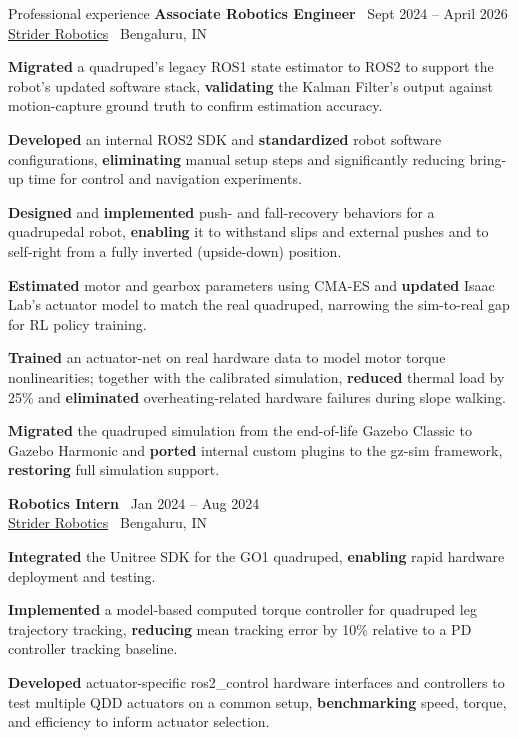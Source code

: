 \documentclass{resume}
\begin{document}
\begin{rSection}{Professional experience}
{\bf Associate Robotics Engineer} \hfill {\ Sept 2024 -- April 2026 }\\ 
{\href{https://www.strider-robotics.in/}{Strider Robotics}} \hfill {\ {Bengaluru, IN}}
\begin{cvitems}
  \item \textbf{Migrated} a quadruped's legacy ROS1 state estimator to ROS2 to support the robot's updated software stack, \textbf{validating} the Kalman Filter's output against motion-capture ground truth to confirm estimation accuracy.  
  \item \textbf{Developed} an internal ROS2 SDK and \textbf{standardized} robot software configurations, \textbf{eliminating} manual setup steps and significantly reducing bring-up time for control and navigation experiments.
  \item \textbf{Designed} and \textbf{implemented} push- and fall-recovery behaviors for a quadrupedal robot, \textbf{enabling} it to withstand slips and external pushes and to self-right from a fully inverted (upside-down) position.
  \item \textbf{Estimated} motor and gearbox parameters using CMA-ES and \textbf{updated} Isaac Lab's actuator model to match the real quadruped, narrowing the sim-to-real gap for RL policy training.
  \item \textbf{Trained} an actuator-net on real hardware data to model motor torque nonlinearities; together with the calibrated simulation, \textbf{reduced} thermal load by 25\% and \textbf{eliminated} overheating-related hardware failures during slope walking.
  \item \textbf{Migrated} the quadruped simulation from the end-of-life Gazebo Classic to Gazebo Harmonic and \textbf{ported} internal custom plugins to the gz-sim framework, \textbf{restoring} full simulation support.
\end{cvitems}
{\bf  Robotics Intern} \hfill {\ Jan 2024 -- Aug 2024 }\\ 
{\href{https://www.strider-robotics.in/}{Strider Robotics}} \hfill {\ {Bengaluru, IN}}
\begin{cvitems}
  \item \textbf{Integrated} the Unitree SDK for the GO1 quadruped, \textbf{enabling} rapid hardware deployment and testing.
  \item \textbf{Implemented} a model-based computed torque controller for quadruped leg trajectory tracking, \textbf{reducing} mean tracking error by 10\% relative to a PD controller tracking baseline. 
  \item \textbf{Developed} actuator-specific ros2\_control hardware interfaces and controllers to test multiple QDD actuators on a common setup, \textbf{benchmarking} speed, torque, and efficiency to inform actuator selection.
\end{cvitems}
\end{rSection}
\end{document}
